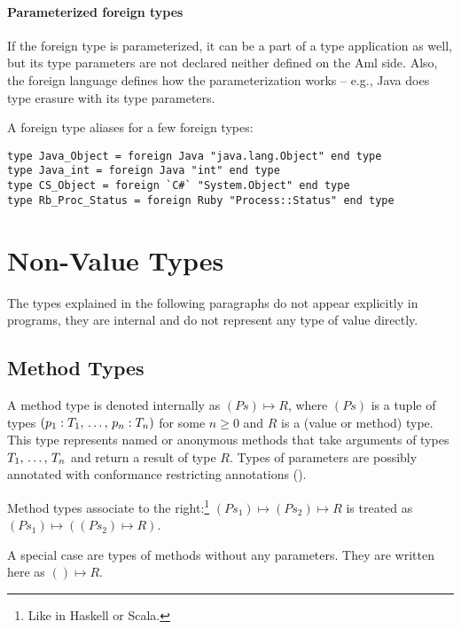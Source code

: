 \paragraph{Parameterized foreign types}
If the foreign type is parameterized, it can be a part of a type application as well, but its type parameters are not declared neither defined on the Aml side. Also, the foreign language defines how the parameterization works -- e.g., Java does type erasure with its type parameters.

\example A foreign type aliases for a few foreign types:
\begin{lstlisting}
type Java_Object = foreign Java "java.lang.Object" end type
type Java_int = foreign Java "int" end type
type CS_Object = foreign `C#` "System.Object" end type
type Rb_Proc_Status = foreign Ruby "Process::Status" end type
\end{lstlisting}







\section{Non-Value Types}

The types explained in the following paragraphs do not appear explicitly in programs, they are internal and do not represent any type of value directly. 






\subsection{Method Types}
\label{sec:method-types}

A method type is denoted internally as $(Ps) \mapsto R$, where $(Ps)$ is a tuple of types  $(p_1 : T_1 ,\, \ldots ,\, p_n : T_n)$ for some $n \geq 0$ and $R$ is a (value or method) type. This type represents named or anonymous methods that take arguments of types $T_1 ,\, \ldots ,\, T_n$ and return a result of type $R$. Types of parameters are possibly annotated with conformance restricting annotations (). 

Method types associate to the right:\footnote{Like in Haskell or Scala.} \newline
$(Ps_1) \mapsto (Ps_2) \mapsto R$ is treated as $(Ps_1) \mapsto ((Ps_2) \mapsto R)$. 

A special case are types of methods without any parameters. They are written here as $() \mapsto R$. 

